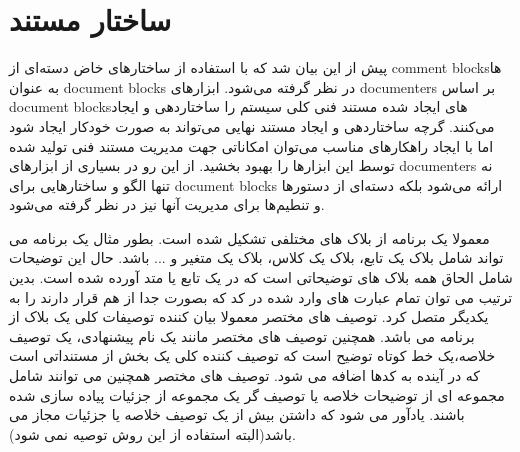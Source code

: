 %
% 
% 
% 
%

\section{ساختار مستند}

پیش از این بیان شد که با استفاده از ساختارهای خاض دسته‌ای از \glspl{comment
block}ها به عنوان \glspl{document block} در نظر گرفته می‌شود. ابزارهای
\glspl{documenter} بر اساس \glspl{document block}های ایجاد شده مستند فنی کلی
سیستم را ساختاردهی و ایجاد می‌کنند. گرچه ساختاردهی و ایجاد مستند نهایی می‌تواند
به صورت خودکار ایجاد شود اما با ایجاد راهکارهای مناسب می‌توان امکاناتی جهت
مدیریت مستند فنی تولید شده توسط این ابزارها را بهبود بخشید. از این رو در بسیاری
از ابزارهای \glspl{documenter} نه تنها الگو و ساختارهایی برای \glspl{document
block} ارائه می‌شود بلکه دسته‌ای از دستورها و تنطیم‌ها برای مدیریت آنها نیز در
نظر گرفته می‌شود.


معمولا یک برنامه از بلاک های مختلفی تشکیل شده است. بطور مثال یک برنامه می تواند
شامل بلاک یک تابع، بلاک یک کلاس، بلاک یک متغیر و ... باشد. حال این توضیحات شامل
الحاق همه بلاک های توضیحاتی است که در یک تابع یا متد آورده شده است. بدین ترتیب
می توان تمام عبارت های وارد شده در کد که بصورت جدا از هم قرار دارند را به یکدیگر
متصل کرد. توصیف های مختصر معمولا بیان کننده توصیفات کلی یک بلاک از برنامه می
باشد. همچنین توصیف های مختصر مانند یک نام پیشنهادی، یک توصیف خلاصه،یک خط کوتاه
توضیح است که توصیف کننده کلی یک بخش از مستنداتی است که در آینده به کدها اضافه می
شود. توصیف های مختصر همچنین می توانند شامل مجموعه ای از توضیحات خلاصه یا توصیف
گر یک مجموعه از جزئیات پیاده سازی شده باشند. یادآور می شود که داشتن بیش از یک
توصیف خلاصه یا جزئیات مجاز می باشد(البته استفاده از این روش توصیه نمی شود).

